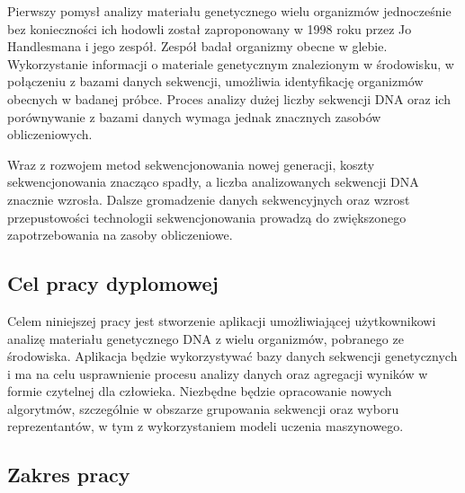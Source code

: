     Pierwszy pomysł analizy materiału genetycznego wielu organizmów jednocześnie bez konieczności ich hodowli został zaproponowany w 1998 roku przez Jo Handlesmana i jego zespół\cite{Handelsman:1998}. Zespół badał organizmy obecne w glebie. Wykorzystanie informacji o materiale genetycznym znalezionym w środowisku, w połączeniu z bazami danych sekwencji, umożliwia  identyfikację organizmów obecnych w badanej próbce. Proces analizy dużej liczby sekwencji DNA oraz ich porównywanie z bazami danych wymaga jednak znacznych zasobów obliczeniowych.

    Wraz z rozwojem metod sekwencjonowania nowej generacji\cite{Reinartz:2002}, koszty sekwencjonowania znacząco spadły, a liczba analizowanych sekwencji DNA znacznie wzrosła\cite{Muir:2016}. Dalsze gromadzenie danych sekwencyjnych oraz wzrost przepustowości technologii sekwencjonowania prowadzą do zwiększonego zapotrzebowania na zasoby obliczeniowe.

    \subsection{Cel pracy dyplomowej}

        Celem niniejszej pracy jest stworzenie aplikacji umożliwiającej użytkownikowi analizę materiału genetycznego DNA z wielu organizmów, pobranego ze środowiska. Aplikacja będzie wykorzystywać bazy danych sekwencji genetycznych i ma na celu usprawnienie procesu analizy danych oraz agregacji wyników w formie czytelnej dla człowieka. Niezbędne będzie opracowanie nowych algorytmów, szczególnie w obszarze grupowania sekwencji oraz wyboru reprezentantów, w tym z wykorzystaniem modeli uczenia maszynowego.

        \subsection {Zakres pracy}


